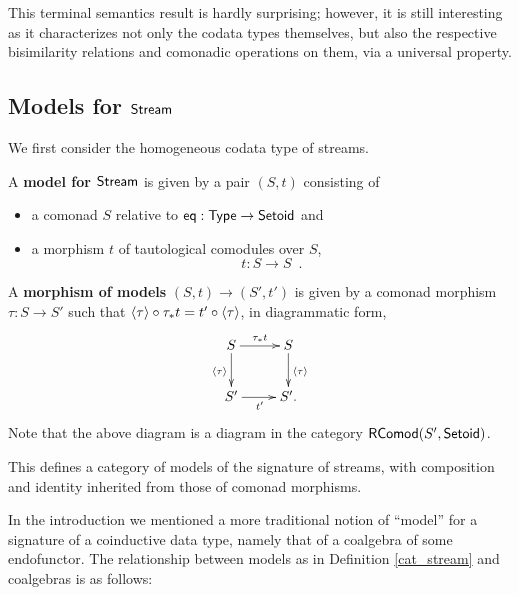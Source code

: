 \documentclass[a4paper,USenglish]{lipics}
\newcommand{\fat}[1]{\textbf{#1}}
\begin{document}
This terminal semantics result is hardly surprising; however, it is still interesting as it characterizes not only the codata types themselves,
 but also the respective bisimilarity relations and comonadic operations on them, via a universal property.



\subsection{Models for \texorpdfstring{$\mathsf{Stream}$}{Stream}}

We first consider the homogeneous codata type of streams.

\begin{definition}
 \label{cat_stream}
  A \fat{model for $\mathsf{Stream}$} is given by a pair $(S,t)$ 
  consisting of
  \begin{itemize}
   \item a comonad $S$ relative to $\mathsf{eq} : \mathsf{Type} \to \mathsf{Setoid}$ and
   \item a morphism $t$ of tautological comodules over $S$, 
                   \[t : S \to S \enspace . \]
  \end{itemize}
  A \fat{morphism of models} $(S,t) \to (S',t')$ is given by a comonad morphism $\tau : S \to S'$ such that
     $ {\langle {\tau} \rangle} \circ {\tau_*t} = {t'} \circ {\ensuremath{\langle {\tau} \rangle}}$, in diagrammatic form,
 \[
  \begin{xy}
   \xymatrix{
                  S \ar[r]^{\tau_*t} \ar[d]_{\induced{\tau}} & S \ar[d]^{\induced{\tau}}\\
                  S' \ar[r]_{t'} & S' .
   }
  \end{xy}
 \]
  Note that the above diagram is a diagram in the category $\mathsf{RComod}(S', \mathsf{Setoid})$. 
  
  This defines a category of models of the signature of streams, with composition and identity inherited from those of comonad morphisms.

\end{definition}

In the introduction we mentioned a more traditional notion of \enquote{model} for a signature of a coinductive data type, 
namely that of a coalgebra of some endofunctor. The relationship between models as in Definition \ref{cat_stream} and coalgebras is as follows:
\end{document}
